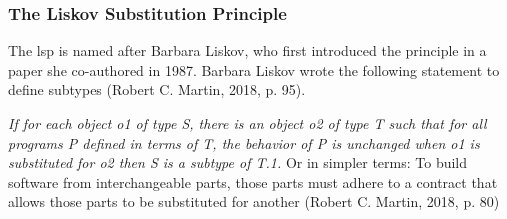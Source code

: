 \subsubsection{The Liskov Substitution Principle} \label{subsubsec_lsp}

The \gls{lsp} is named after Barbara Liskov, who first introduced the principle in a paper
she co-authored in 1987. Barbara Liskov wrote the following statement to define subtypes
(Robert C. Martin, 2018, p. 95). 

\textit{If for each object o1 of type S, there is an object o2 of
type T such that for all programs P defined in terms of T, the behavior of P is unchanged
when o1 is substituted for o2 then S is a subtype of T.1.} Or in simpler terms: To build
software from interchangeable parts, those parts must adhere to a contract that allows
those parts to be substituted for another (Robert C. Martin, 2018, p. 80)